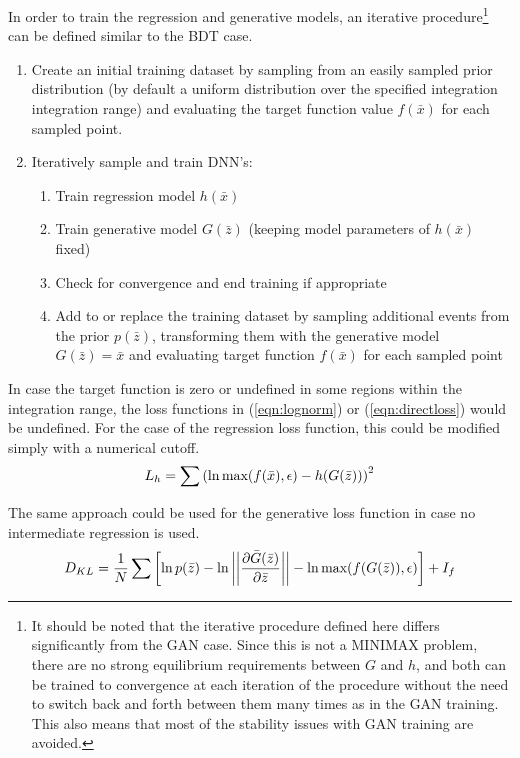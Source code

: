 \documentclass[a4paper,11pt]{article}
\begin{document}
In order to train the regression and generative models, an iterative procedure\footnote{It should be noted that the iterative procedure defined here differs significantly from the GAN case.  Since this is not a MINIMAX problem, there are no strong equilibrium requirements between $G$ and $h$, and both can be trained to convergence at each iteration of the procedure without the need to switch back and forth between them many times as in the GAN training.  This also means that most of the stability issues with GAN training are avoided.} can be defined similar to the BDT case.

\begin{enumerate}
 \item Create an initial training dataset by sampling from an easily sampled prior distribution (by default a uniform distribution over the specified integration integration range) and evaluating the target function value $f(\bar x)$ for each sampled point.
 \item Iteratively sample and train DNN's:
 \begin{enumerate}
  \item Train regression model $h(\bar x)$
  \item Train generative model $G(\bar z)$ (keeping model parameters of $h(\bar x)$ fixed)
  \item Check for convergence and end training if appropriate
  \item Add to or replace the training dataset by sampling additional events from the prior $p(\bar z)$, transforming them with the generative model $G(\bar z)=\bar x$ and evaluating target function $f(\bar x)$ for each sampled point
 \end{enumerate}
\end{enumerate}

In case the target function is zero or undefined in some regions within the integration range, the loss functions in (\ref{eqn:lognorm}) or (\ref{eqn:directloss}) would be undefined.  For the case of the regression loss function, this could be modified simply with a numerical cutoff.
\begin{equation}
 L_h = \sum\left(\ln \textnormal{max}(f(\bar x),\epsilon) - h(G(\bar z))\right)^2
\end{equation}

The same approach could be used for the generative loss function in case no intermediate regression is used.
  \begin{equation}
  D_{KL} = \frac{1}{N}\sum\left[\ln p(\bar z) - \ln\left|\left|\frac{\partial \bar G(\bar z)}{\partial\bar z}\right|\right| - \ln \textnormal{max}(f(G(\bar z)),\epsilon) \right] + I_f
  \end{equation}
\end{document}
